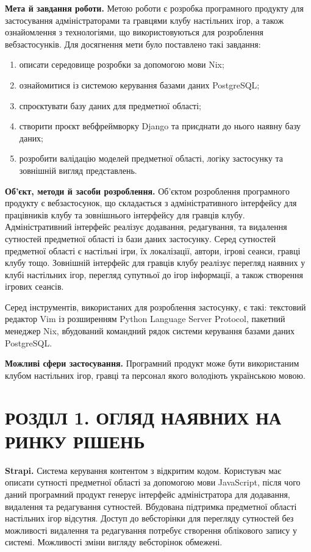 \documentclass[a4paper, 14pt]{extarticle}
\begin{document}
  \textbf{Мета й завдання роботи.}
  Метою роботи є розробка програмного продукту для застосування адміністраторами
  та гравцями клубу настільних ігор, а також ознайомлення з технологіями, що
  використовуються для розроблення вебзастосунків. Для досягнення мети було поставлено
  такі завдання:

  \begin{enumerate}[nosep, label=\arabic*)]
    \item описати середовище розробки за допомогою мови Nix;
    \item ознайомитися із системою керування базами даних PostgreSQL;
    \item спроєктувати базу даних для предметної області;
    \item створити проєкт вебфреймворку Django та приєднати до нього наявну базу даних;
    \item розробити валідацію моделей предметної області, логіку застосунку та зовнішній
      вигляд представлень.
  \end{enumerate}

  \textbf{Об’єкт, методи й засоби розроблення.}
  Об'єктом розроблення програмного продукту є вебзастосунок, що складається
  з адміністративного інтерфейсу для працівників клубу та зовнішнього інтерфейсу
  для гравців клубу. Адміністративний інтерфейс реалізує додавання, редагування,
  та видалення сутностей предметної області із бази даних застосунку. Серед
  сутностей предметної області є настільні ігри, їх локалізації, автори, ігрові сеанси,
  гравці клубу тощо. Зовнішній інтерфейс для гравців клубу реалізує перегляд наявних
  у клубі настільних ігор, перегляд супутньої до ігор інформації, а також створення
  ігрових сеансів.

  Серед інструментів, використаних для розроблення застосунку, є такі: текстовий редактор
  Vim із розширенням Python Language Server Protocol,
  пакетний менеджер Nix, вбудований командний рядок системи керування базами даних
  PostgreSQL.

  \textbf{Можливі сфери застосування.}
  Програмний продукт може бути використаним клубом настільних ігор, гравці та персонал
  якого володіють українською мовою.

  \clearpage

  \section{РОЗДІЛ 1. ОГЛЯД НАЯВНИХ НА РИНКУ РІШЕНЬ}
  \textbf{Strapi.} Система керування контентом з відкритим кодом.
  Користувач має описати сутності предметної області за допомогою мови JavaScript, після
  чого даний програмний продукт генерує інтерфейс адміністратора для додавання, видалення
  та редагування сутностей. Вбудована підтримка предметної області настільних ігор
  відсутня. Доступ до вебсторінки для перегляду сутностей без можливості видалення та
  редагування потребує створення облікового запису у системі. Можливості зміни вигляду
  вебсторінок обмежені.
\end{document}
